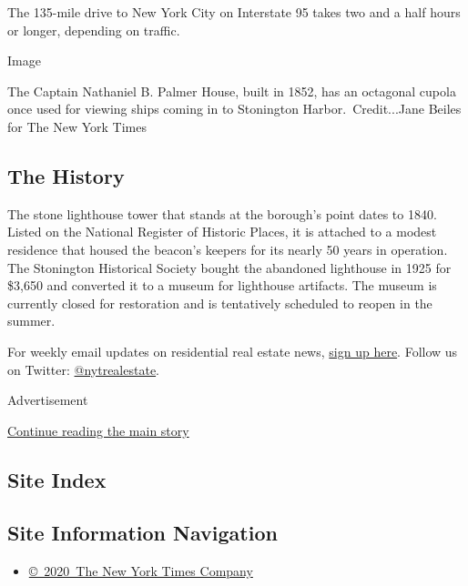 The 135-mile drive to New York City on Interstate 95 takes two and a
half hours or longer, depending on traffic.

Image

The Captain Nathaniel B. Palmer House, built in 1852, has an octagonal
cupola once used for viewing ships coming in to Stonington
Harbor.~Credit...Jane Beiles for The New York Times

\hypertarget{the-history}{%
\subsection{The History}\label{the-history}}

The stone lighthouse tower that stands at the borough's point dates to
1840. Listed on the National Register of Historic Places, it is attached
to a modest residence that housed the beacon's keepers for its nearly 50
years in operation. The Stonington Historical Society bought the
abandoned lighthouse in 1925 for \$3,650 and converted it to a museum
for lighthouse artifacts. The museum is currently closed for restoration
and is tentatively scheduled to reopen in the summer.

For weekly email updates on residential real estate news,
\href{http://www.nytimes.com/newsletters/realestate/}{sign up here}.
Follow us on Twitter:
\href{https://twitter.com/nytrealestate}{@nytrealestate}.

Advertisement

\protect\hyperlink{after-bottom}{Continue reading the main story}

\hypertarget{site-index}{%
\subsection{Site Index}\label{site-index}}

\hypertarget{site-information-navigation}{%
\subsection{Site Information
Navigation}\label{site-information-navigation}}

\begin{itemize}
\tightlist
\item
  \href{https://help.nytimes.com/hc/en-us/articles/115014792127-Copyright-notice}{©~2020~The
  New York Times Company}
\end{itemize}


